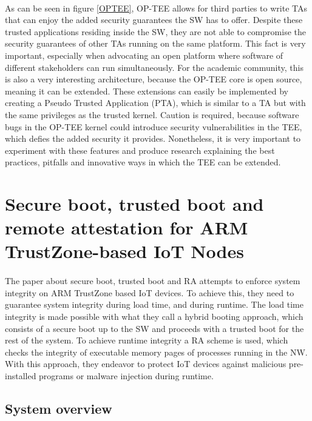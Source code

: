 \paragraph*{}
As can be seen in figure \ref{OPTEE}, OP-TEE allows for third parties to write TAs that can enjoy the added security guarantees the SW has to offer. Despite these trusted applications residing inside the SW, they are not able to compromise the security guarantees of other TAs running on the same platform. This fact is very important, especially when advocating an open platform where software of different stakeholders can run simultaneously. For the academic community, this is also a very interesting architecture, because the OP-TEE core is open source, meaning it can be extended. These extensions can easily be implemented by creating a Pseudo Trusted Application (PTA), which is similar to a TA but with the same privileges as the trusted kernel. Caution is required, because software bugs in the OP-TEE kernel could introduce security vulnerabilities in the TEE, which defies the added security it provides. Nonetheless, it is very important to experiment with these features and produce research explaining the best practices, pitfalls and innovative ways in which the TEE can be extended.

\section{Secure boot, trusted boot and remote attestation for ARM TrustZone-based IoT Nodes \cite{LingZhen2021Sbtb}}

\paragraph*{}
The paper \cite{LingZhen2021Sbtb} about secure boot, trusted boot and RA attempts to enforce system integrity on ARM TrustZone based IoT devices. To achieve this, they need to guarantee system integrity during load time, and during runtime. The load time integrity is made possible with what they call a hybrid booting approach, which consists of a secure boot up to the SW and proceeds with a trusted boot for the rest of the system. To achieve runtime integrity a RA scheme is used, which checks the integrity of executable memory pages of processes running in the NW. With this approach, they endeavor to protect IoT devices against malicious pre-installed programs or malware injection during runtime.

\subsection*{System overview}

